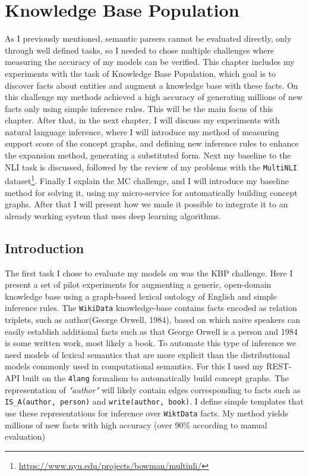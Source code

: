 \chapter{Knowledge Base Population}
\label{chap:kbp}

As I previously mentioned, semantic parsers cannot be evaluated directly, only through well defined tasks, so I needed to chose multiple challenges where measuring the accuracy of my models can be verified. This chapter includes my experiments with the task of Knowledge Base Population, which goal is to discover facts about entities and augment a knowledge base with these facts. On this challenge my methods achieved a high accuracy of generating millions of new facts only using simple inference rules. This will be the main focus of this chapter. After that, in the next chapter, I will discuss my experiments with natural language inference, where I will introduce my method of measuring support score of the concept graphs, and defining new inference rules to enhance the expansion method, generating a substituted form. Next my baseline to the NLI task is discussed, followed by the review of my problems with the \texttt{MultiNLI} dataset\footnote{\url{https://www.nyu.edu/projects/bowman/multinli/}}. Finally I explain the MC challenge, and I will introduce my baseline method for solving it, using my micro-service for automatically building concept graphs. After that I will present how we made it possible to integrate it to an already working system that uses deep learning algorithms.

\section{Introduction} 
The first task I chose to evaluate my models on was the KBP challenge. Here I present a set of pilot experiments for augmenting a generic, open-domain 
knowledge base using a graph-based lexical ontology of English and simple
inference rules. The \texttt{WikiData} knowledge-base contains facts encoded as relation
triplets, such as author(George Orwell, 1984), based on which naive
speakers can easily establish additional facts such as that George Orwell is a
person and 1984 is some written work, most likely a book. To automate this type
of inference we need models of lexical semantics that are more explicit than
the distributional models commonly used in computational semantics. For this I used my REST-API built on the \texttt{4lang} formalism to automatically build concept graphs. The representation of \textit{"author"} will likely contain edges
corresponding to facts such as \texttt{IS\_A(author, person)} and
\texttt{write(author, book)}.
I define simple templates that use these representations for inference over
\texttt{WiktData} facts. My method yields millions of new facts with high
accuracy (over 90\% according to manual evaluation)

